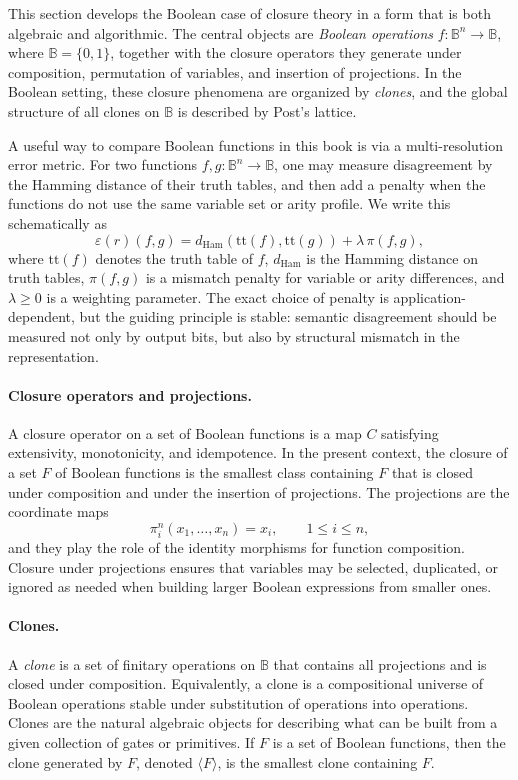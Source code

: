 \documentclass[11pt]{article}
\begin{document}

This section develops the Boolean case of closure theory in a form that is both algebraic and algorithmic. The central objects are \emph{Boolean operations} $f \colon \mathbb{B}^n \to \mathbb{B}$, where $\mathbb{B}=\{0,1\}$, together with the closure operators they generate under composition, permutation of variables, and insertion of projections. In the Boolean setting, these closure phenomena are organized by \emph{clones}, and the global structure of all clones on $\mathbb{B}$ is described by Post's lattice.

A useful way to compare Boolean functions in this book is via a multi-resolution error metric. For two functions $f,g \colon \mathbb{B}^n \to \mathbb{B}$, one may measure disagreement by the Hamming distance of their truth tables, and then add a penalty when the functions do not use the same variable set or arity profile. We write this schematically as
\[
\varepsilon(r)(f,g) = d_{\mathrm{Ham}}(\mathrm{tt}(f),\mathrm{tt}(g)) + \lambda\,\pi(f,g),
\]
where $\mathrm{tt}(f)$ denotes the truth table of $f$, $d_{\mathrm{Ham}}$ is the Hamming distance on truth tables, $\pi(f,g)$ is a mismatch penalty for variable or arity differences, and $\lambda \ge 0$ is a weighting parameter. The exact choice of penalty is application-dependent, but the guiding principle is stable: semantic disagreement should be measured not only by output bits, but also by structural mismatch in the representation.

\paragraph{Closure operators and projections.}
A closure operator on a set of Boolean functions is a map $C$ satisfying extensivity, monotonicity, and idempotence. In the present context, the closure of a set $F$ of Boolean functions is the smallest class containing $F$ that is closed under composition and under the insertion of projections. The projections are the coordinate maps
\[
\pi_i^n(x_1,\dots,x_n)=x_i, \qquad 1\le i\le n,
\]
and they play the role of the identity morphisms for function composition. Closure under projections ensures that variables may be selected, duplicated, or ignored as needed when building larger Boolean expressions from smaller ones.

\paragraph{Clones.}
A \emph{clone} is a set of finitary operations on $\mathbb{B}$ that contains all projections and is closed under composition. Equivalently, a clone is a compositional universe of Boolean operations stable under substitution of operations into operations. Clones are the natural algebraic objects for describing what can be built from a given collection of gates or primitives. If $F$ is a set of Boolean functions, then the clone generated by $F$, denoted $\langle F\rangle$, is the smallest clone containing $F$.
\end{document}

